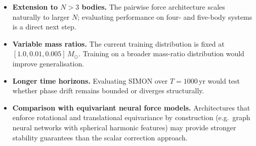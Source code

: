 \documentclass[12pt]{article}
\begin{document}
\begin{itemize}
  \item \textbf{Extension to $N > 3$ bodies.} The pairwise force architecture scales
        naturally to larger $N$; evaluating performance on four- and five-body systems
        is a direct next step.
  \item \textbf{Variable mass ratios.} The current training distribution is fixed at
        $[1.0, 0.01, 0.005]\,M_\odot$. Training on a broader mass-ratio distribution
        would improve generalisation.
  \item \textbf{Longer time horizons.} Evaluating SIMON over $T = 1000$\,yr would
        test whether phase drift remains bounded or diverges structurally.
  \item \textbf{Comparison with equivariant neural force models.} Architectures that
        enforce rotational and translational equivariance by construction (e.g.\
        graph neural networks with spherical harmonic features) may provide stronger
        stability guarantees than the scalar correction approach.
\end{itemize}

\newpage




\end{document}
